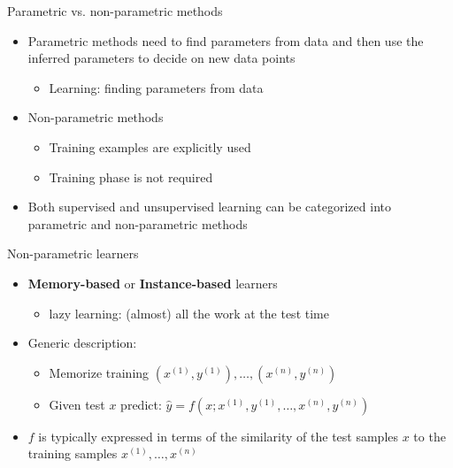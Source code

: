 \documentclass[serif, aspectratio=169]{beamer}
\begin{document}
\begin{frame}{Parametric vs. non-parametric methods}
    \begin{itemize}
        \item Parametric methods need to find parameters from data and then use the inferred parameters to decide on new data points
        \begin{itemize}
            \item Learning: finding parameters from data
        \end{itemize}
        \item Non-parametric methods
        \begin{itemize}
            \item Training examples are explicitly used
            \item Training phase is not required
        \end{itemize}
        \item Both supervised and unsupervised learning can be categorized into parametric and non-parametric methods
    \end{itemize}
\end{frame}
\begin{frame}{Non-parametric learners}
    \begin{itemize}
        \item \textbf{Memory-based} or \textbf{Instance-based} learners
        \begin{itemize}
            \item lazy learning: (almost) all the work at the test time
        \end{itemize}
        
        \item Generic description:
        \begin{itemize}
            \item Memorize training $(x^{(1)}, y^{(1)}), \dots, (x^{(n)}, y^{(n)})$
            \item Given test $x$ predict: $\hat{y} = f(x;x^{(1)}, y^{(1)}, \dots, x^{(n)}, y^{(n)})$
        \end{itemize}
        \item $f$ is typically expressed in terms of the similarity of the test samples $x$ to the training samples $x^{(1)}, \dots, x^{(n)}$
    \end{itemize}
\end{frame}
\end{document}
